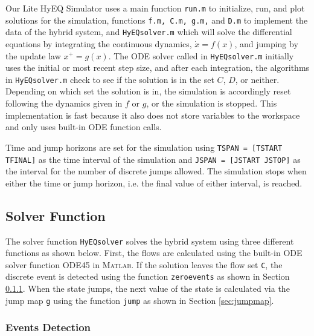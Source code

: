 \documentclass{article}
\newcommand{\matlab}{\textsc{Matlab}}
\newcommand{\ricardo}[1]{{\color{blue} #1}}
\begin{document}
Our Lite HyEQ Simulator uses a main function {\tt run.m} to initialize, run, and plot solutions for the simulation, functions {\tt f.m, C.m, g.m,} and {\tt D.m} to implement the data of the hybrid system, and {\tt HyEQsolver.m} which will solve the differential equations by integrating the continuous dynamics, $\dot{x}=f(x)$, and jumping by the update law $x^+ = g(x)$. The ODE solver called in {\tt HyEQsolver.m} initially uses the initial or most recent step size, and after each integration, the algorithms in {\tt HyEQsolver.m} check to see if the solution is in the set $C$, $D$, or neither. Depending on which set the solution is in, the simulation is accordingly reset following the dynamics given in $f$ or $g$, or the simulation is stopped. This implementation is fast because it also does not store variables to the workspace and only uses built-in ODE function calls.

Time and jump horizons are set for the simulation using {\tt TSPAN = [TSTART TFINAL]} as the time interval of the simulation and {\tt JSPAN = [JSTART \hspace{2mm} JSTOP]} as the interval for the number of discrete jumps allowed. The simulation stops when either the time or jump horizon, i.e. the final value of either interval, is reached.



\subsection{Solver Function}


The solver function {\tt HyEQsolver} solves the hybrid system using three different functions as shown below. 
First, the flows are calculated using the built-in ODE solver function ODE45 in \matlab{}. 
If the solution leaves the flow set {\tt C}, the discrete event is detected using 
the function {\tt zeroevents} as shown in Section \ref{sec:eventsdetection}. When the state jumps, 
the next value of the state is calculated via the jump map {\tt g} using the function {\tt jump} 
as shown in Section \ref{sec:jumpmap}.\\

% 
\label{scr:HyEQsolver}

\subsubsection{Events Detection}
\label{sec:eventsdetection}
\end{document}
